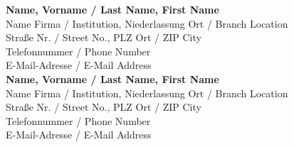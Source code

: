 \ifnum{}
\else
\fi

\textbf{Name, Vorname / Last Name, First Name} \\
	Name Firma / Institution, Niederlassung Ort / Branch Location \\
	Straße Nr. / Street No., PLZ Ort / ZIP City  \\
	Telefonnummer / Phone Number \\
	E-Mail-Adresse / E-Mail Address \\

\textbf{Name, Vorname / Last Name, First Name} \\
	Name Firma / Institution, Niederlassung Ort / Branch Location \\
	Straße Nr. / Street No., PLZ Ort / ZIP City \\
	Telefonnummer / Phone Number \\
	E-Mail-Adresse / E-Mail Address \\
